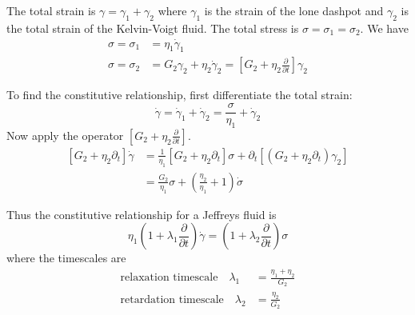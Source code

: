 \documentclass{jknotes}
\newcommand{\srate}{\dot{\gamma}}
\begin{document}
\begin{center}
\end{center}

The total strain is $\gamma = \gamma_1 + \gamma_2$ where $\gamma_1$ is the
strain of the lone dashpot and $\gamma_2$ is the total strain of the
Kelvin-Voigt fluid. The total stress is $\sigma = \sigma_1 = \sigma_2$. We
have
\begin{align}
	\sigma = \sigma_1 &= \eta_1 \srate_1 \\
	\sigma = \sigma_2 &= G_2 \gamma_2 + \eta_2 \srate_2 = \left[ G_2 + \eta_2
	\frac{\partial}{\partial t}\right] \gamma_2
\end{align}

To find the constitutive relationship, first differentiate the total strain:
\begin{equation}
	\srate = \srate_1 + \srate_2 = \frac{\sigma}{\eta_1} + \srate_2
\end{equation}
Now apply the operator $\left[ G_2 + \eta_2 \frac{\partial}{\partial
t}\right]$.
\begin{align}
	\left[ G_2 + \eta_2 \partial_t\right] \srate &= \frac{1}{\eta_1} \left[
		G_2 + \eta_2 \partial_t\right]\sigma + \partial_t \left[ (G_2 + \eta_2
	\partial_t) \gamma_2\right] \\
	&= \frac{G_2}{\eta_1}\sigma + \left( \frac{\eta_2}{\eta_1}+1\right)
	\dot{\sigma}
\end{align}

Thus the constitutive relationship for a Jeffreys fluid is
\begin{equation}
	\eta_1 \left( 1 + \lambda_1 \frac{\partial}{\partial t} \right)
	\srate = \left( 1 + \lambda_2\frac{\partial}{\partial
	t}\right) \sigma
\end{equation}
where the timescales are
\begin{align}
	\text{relaxation timescale} \hspace{1em} \lambda_1 &=
	\frac{\eta_1+\eta_2}{G_2} \\
	\text{retardation timescale} \hspace{1em} \lambda_2 &= \frac{\eta_2}{G_2}
\end{align}
\end{document}
